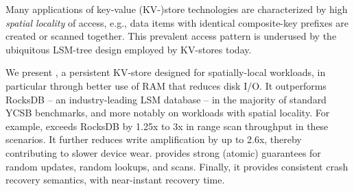 Many applications of key-value (KV-)store technologies are characterized by high \emph{spatial locality}
of access, e.g., data items with identical composite-key prefixes are created or scanned together.  
This prevalent access pattern is underused by the ubiquitous LSM-tree design employed by KV-stores today.

We present \sys, a persistent KV-store designed for spatially-local workloads, in particular through better use of RAM
that reduces disk I/O.  It outperforms RocksDB -- an industry-leading LSM database -- in the majority 
of standard YCSB benchmarks, and more notably on workloads with spatial locality. For example, \sys\/ 
exceeds RocksDB by 1.25x to 3x in range scan throughput in these scenarios. It further reduces write amplification 
by up to 2.6x, thereby contributing to slower device wear. \sys\/ provides strong (atomic) guarantees for random updates, random lookups, and scans. Finally, it provides consistent crash recovery semantics, with near-instant recovery time. 